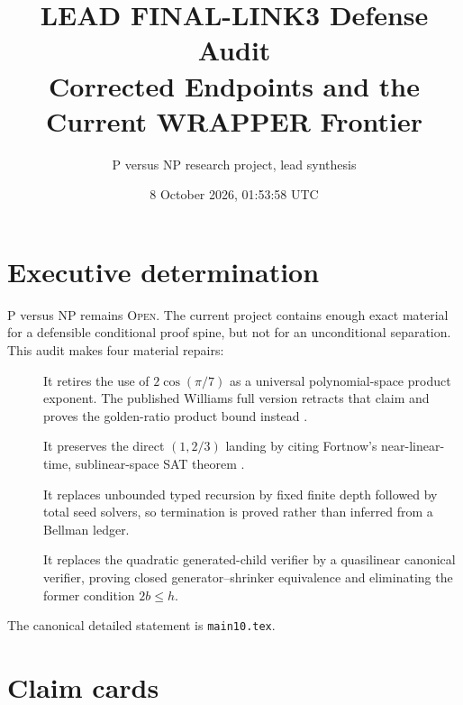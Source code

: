 \documentclass[11pt]{article}
\title{LEAD FINAL-LINK3 Defense Audit\\
Corrected Endpoints and the Current WRAPPER Frontier}
\author{P versus NP research project, lead synthesis}
\date{8 October 2026, 01:53:58 UTC}
\newcommand{\Open}{\textsc{Open}}
\begin{document}
\maketitle

\section{Executive determination}

P versus NP remains \Open{}.  The current project contains enough exact
material for a defensible conditional proof spine, but not for an
unconditional separation.  This audit makes four material repairs:
\begin{description}
\item[] It retires the use of $2\cos(\pi/7)$ as a universal polynomial-space
product exponent.  The published Williams full version retracts that claim
and proves the golden-ratio product bound instead \cite{williams2010}.
\item[] It preserves the direct $(1,2/3)$ landing by citing Fortnow's
near-linear-time, sublinear-space SAT theorem \cite{fortnow2000}.
\item[] It replaces unbounded typed recursion by fixed finite depth followed
by total seed solvers, so termination is proved rather than inferred from a
Bellman ledger.
\item[] It replaces the quadratic generated-child verifier by a
quasilinear canonical verifier, proving closed generator--shrinker
equivalence and eliminating the former condition $2b\le h$.
\end{description}

The canonical detailed statement is \texttt{main10.tex}.

\section{Claim cards}
\end{document}
